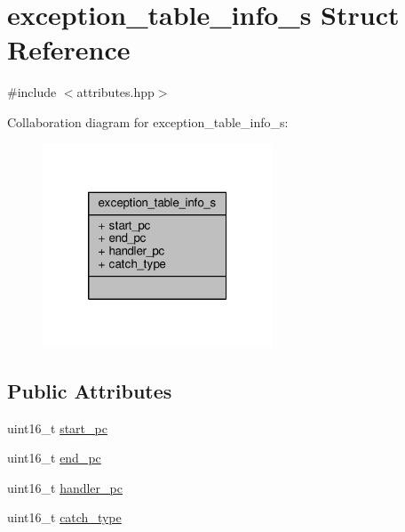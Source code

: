 \hypertarget{structexception__table__info__s}{\section{exception\+\_\+table\+\_\+info\+\_\+s Struct Reference}
\label{structexception__table__info__s}
}


{\ttfamily \#include $<$attributes.\+hpp$>$}



Collaboration diagram for exception\+\_\+table\+\_\+info\+\_\+s\+:\nopagebreak
\begin{figure}[H]
\begin{center}
\leavevmode
\includegraphics[width=194pt]{structexception__table__info__s__coll__graph}
\end{center}
\end{figure}
\subsection*{Public Attributes}
\begin{DoxyCompactItemize}
\item 
uint16\+\_\+t \hyperlink{structexception__table__info__s_ae92c43a2d7c711e34fda9bc778e7019c}{start\+\_\+pc}
\item 
uint16\+\_\+t \hyperlink{structexception__table__info__s_ab7f40660c6dfb31d0d33443f8631a86b}{end\+\_\+pc}
\item 
uint16\+\_\+t \hyperlink{structexception__table__info__s_afce7361ca9bc44352ab13a94890d7644}{handler\+\_\+pc}
\item 
uint16\+\_\+t \hyperlink{structexception__table__info__s_a797170f960fb0a1797a69bca7a1567d0}{catch\+\_\+type}
\end{DoxyCompactItemize}


